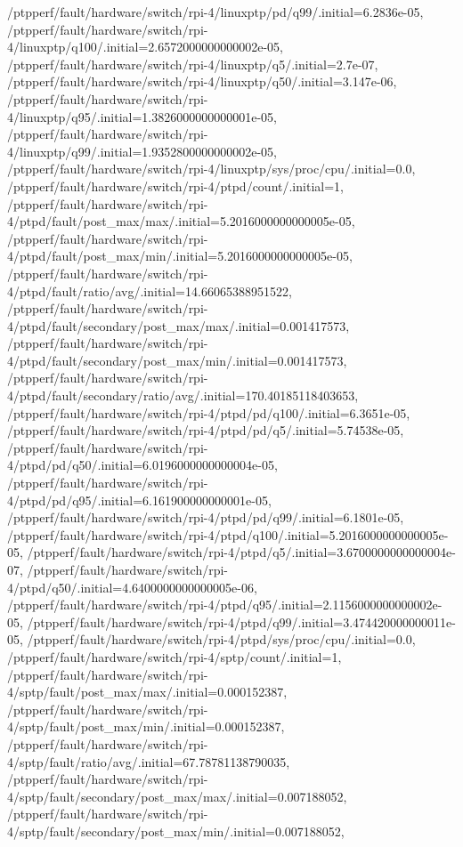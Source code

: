 {    /ptpperf/fault/hardware/switch/rpi-4/linuxptp/pd/q99/.initial=6.2836e-05,
    /ptpperf/fault/hardware/switch/rpi-4/linuxptp/q100/.initial=2.6572000000000002e-05,
    /ptpperf/fault/hardware/switch/rpi-4/linuxptp/q5/.initial=2.7e-07,
    /ptpperf/fault/hardware/switch/rpi-4/linuxptp/q50/.initial=3.147e-06,
    /ptpperf/fault/hardware/switch/rpi-4/linuxptp/q95/.initial=1.3826000000000001e-05,
    /ptpperf/fault/hardware/switch/rpi-4/linuxptp/q99/.initial=1.9352800000000002e-05,
    /ptpperf/fault/hardware/switch/rpi-4/linuxptp/sys/proc/cpu/.initial=0.0,
    /ptpperf/fault/hardware/switch/rpi-4/ptpd/count/.initial=1,
    /ptpperf/fault/hardware/switch/rpi-4/ptpd/fault/post_max/max/.initial=5.2016000000000005e-05,
    /ptpperf/fault/hardware/switch/rpi-4/ptpd/fault/post_max/min/.initial=5.2016000000000005e-05,
    /ptpperf/fault/hardware/switch/rpi-4/ptpd/fault/ratio/avg/.initial=14.66065388951522,
    /ptpperf/fault/hardware/switch/rpi-4/ptpd/fault/secondary/post_max/max/.initial=0.001417573,
    /ptpperf/fault/hardware/switch/rpi-4/ptpd/fault/secondary/post_max/min/.initial=0.001417573,
    /ptpperf/fault/hardware/switch/rpi-4/ptpd/fault/secondary/ratio/avg/.initial=170.40185118403653,
    /ptpperf/fault/hardware/switch/rpi-4/ptpd/pd/q100/.initial=6.3651e-05,
    /ptpperf/fault/hardware/switch/rpi-4/ptpd/pd/q5/.initial=5.74538e-05,
    /ptpperf/fault/hardware/switch/rpi-4/ptpd/pd/q50/.initial=6.0196000000000004e-05,
    /ptpperf/fault/hardware/switch/rpi-4/ptpd/pd/q95/.initial=6.161900000000001e-05,
    /ptpperf/fault/hardware/switch/rpi-4/ptpd/pd/q99/.initial=6.1801e-05,
    /ptpperf/fault/hardware/switch/rpi-4/ptpd/q100/.initial=5.2016000000000005e-05,
    /ptpperf/fault/hardware/switch/rpi-4/ptpd/q5/.initial=3.6700000000000004e-07,
    /ptpperf/fault/hardware/switch/rpi-4/ptpd/q50/.initial=4.6400000000000005e-06,
    /ptpperf/fault/hardware/switch/rpi-4/ptpd/q95/.initial=2.1156000000000002e-05,
    /ptpperf/fault/hardware/switch/rpi-4/ptpd/q99/.initial=3.474420000000011e-05,
    /ptpperf/fault/hardware/switch/rpi-4/ptpd/sys/proc/cpu/.initial=0.0,
    /ptpperf/fault/hardware/switch/rpi-4/sptp/count/.initial=1,
    /ptpperf/fault/hardware/switch/rpi-4/sptp/fault/post_max/max/.initial=0.000152387,
    /ptpperf/fault/hardware/switch/rpi-4/sptp/fault/post_max/min/.initial=0.000152387,
    /ptpperf/fault/hardware/switch/rpi-4/sptp/fault/ratio/avg/.initial=67.78781138790035,
    /ptpperf/fault/hardware/switch/rpi-4/sptp/fault/secondary/post_max/max/.initial=0.007188052,
    /ptpperf/fault/hardware/switch/rpi-4/sptp/fault/secondary/post_max/min/.initial=0.007188052,
}
